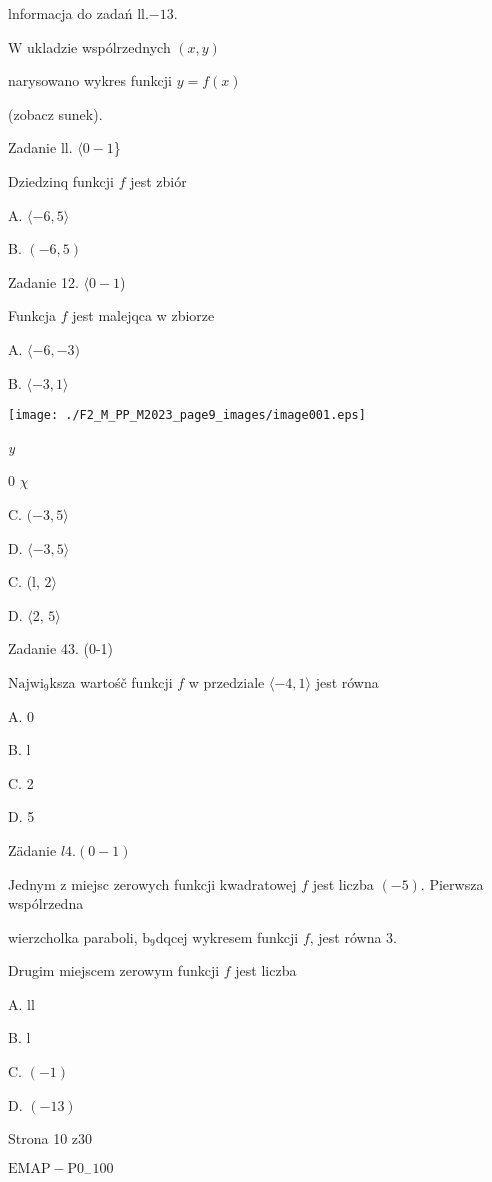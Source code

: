 \documentclass[a4paper,12pt]{article}
\begin{document}
lnformacja do zadań ll.$-13.$

$\mathrm{W}$ ukladzie wspólrzednych $(x,y)$

narysowano wykres funkcji $y=f(x)$

(zobacz sunek).

Zadanie ll. $\langle 0-1$\}

Dziedzinq funkcji $f$ jest zbiór

A. $\langle-6,  5\rangle$

B. $(-6,5)$

Zadanie 12. $\langle 0-1$)

Funkcja $f$ jest malejqca w zbiorze

A. $\langle-6, -3)$

B. $\langle-3,1\rangle$
\begin{center}
\texttt{[image: ./F2\_M\_PP\_M2023\_page9\_images/image001.eps]}
\end{center}
{\it y}

0  $\chi$

C. $(-3,5\rangle$

D. $\langle-3,  5\rangle$

C. (l, $ 2\rangle$

D. $\langle$2, $ 5\rangle$

Zadanie 43. (0-1)

$\mathrm{N}\mathrm{a}\mathrm{j}\mathrm{w}\mathrm{i}_{9}$ksza wartośč funkcji $f$ w przedziale $\langle-4,  1\rangle$ jest równa

A. 0

B. l

C. 2

D. 5

Zädanie $l4. (0-1)$

Jednym z miejsc zerowych funkcji kwadratowej $f$ jest liczba $(-5)$. Pierwsza wspólrzedna

wierzcholka paraboli, $\mathrm{b}_{9}$dqcej wykresem funkcji $f$, jest równa 3.

Drugim miejscem zerowym funkcji $f$ jest liczba

A. ll

B. l

C. $(-1)$

D. $(-13)$

Strona 10 z30

$\mathrm{E}\mathrm{M}\mathrm{A}\mathrm{P}-\mathrm{P}0_{-}100$
\end{document}
